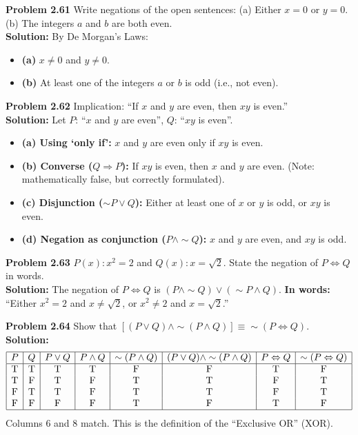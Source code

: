\documentclass{article}
\begin{document}
\vspace{1em}
\textbf{Problem 2.61} Write negations of the open sentences: (a) Either $x = 0$ or $y = 0$. (b) The integers $a$ and $b$ are both even.
\\[0.5em]
\textbf{Solution:} By De Morgan's Laws:
\begin{itemize}
    \item \textbf{(a)} $x \neq 0$ and $y \neq 0$.
    \item \textbf{(b)} At least one of the integers $a$ or $b$ is odd (i.e., not even).
\end{itemize}

\vspace{1em}
\textbf{Problem 2.62} Implication: ``If $x$ and $y$ are even, then $xy$ is even.''
\\[0.5em]
\textbf{Solution:} 
Let $P$: ``$x$ and $y$ are even'', $Q$: ``$xy$ is even''.
\begin{itemize}
    \item \textbf{(a) Using `only if':} $x$ and $y$ are even only if $xy$ is even.
    \item \textbf{(b) Converse ($Q \Rightarrow P$):} If $xy$ is even, then $x$ and $y$ are even. (Note: mathematically false, but correctly formulated).
    \item \textbf{(c) Disjunction ($\sim P \lor Q$):} Either at least one of $x$ or $y$ is odd, or $xy$ is even.
    \item \textbf{(d) Negation as conjunction ($P \land \sim Q$):} $x$ and $y$ are even, and $xy$ is odd.
\end{itemize}

\vspace{1em}
\textbf{Problem 2.63} $P(x): x^2 = 2$ and $Q(x): x = \sqrt{2}$. State the negation of $P \Leftrightarrow Q$ in words.
\\[0.5em]
\textbf{Solution:} The negation of $P \Leftrightarrow Q$ is $(P \land \sim Q) \lor (\sim P \land Q)$.
\textbf{In words:} ``Either $x^2 = 2$ and $x \neq \sqrt{2}$, or $x^2 \neq 2$ and $x = \sqrt{2}$.''

\vspace{1em}
\textbf{Problem 2.64} Show that $[(P \lor Q) \land \sim(P \land Q)] \equiv \sim(P \Leftrightarrow Q)$.
\\[0.5em]
\textbf{Solution:}
\[
\begin{array}{|c|c|c|c|c|c|c|c|}
\hline
P & Q & P \lor Q & P \land Q & \sim(P \land Q) & (P \lor Q) \land \sim(P \land Q) & P \Leftrightarrow Q & \sim(P \Leftrightarrow Q) \\
\hline
\text{T} & \text{T} & \text{T} & \text{T} & \text{F} & \text{F} & \text{T} & \text{F} \\
\text{T} & \text{F} & \text{T} & \text{F} & \text{T} & \text{T} & \text{F} & \text{T} \\
\text{F} & \text{T} & \text{T} & \text{F} & \text{T} & \text{T} & \text{F} & \text{T} \\
\text{F} & \text{F} & \text{F} & \text{F} & \text{T} & \text{F} & \text{T} & \text{F} \\
\hline
\end{array}
\]
Columns 6 and 8 match. This is the definition of the ``Exclusive OR'' (XOR).
\end{document}
